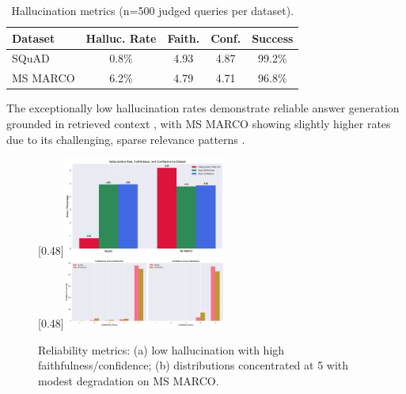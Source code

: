 \documentclass[conference]{IEEEtran}
\begin{document}
\begin{table}[ht]
\setlength{\tabcolsep}{4pt}
\centering
\caption{Hallucination metrics (n=500 judged queries per dataset).}
\label{tab:hallucination}
\begin{tabular}{@{}l c c c c@{}}
\toprule
\textbf{Dataset} & \textbf{Halluc. Rate} & \textbf{Faith.} & \textbf{Conf.} & \textbf{Success} \\
\midrule
SQuAD & 0.8\% & 4.93 & 4.87 & 99.2\% \\
MS MARCO & 6.2\% & 4.79 & 4.71 & 96.8\% \\
\bottomrule
\end{tabular}
\end{table}

The exceptionally low hallucination rates demonstrate reliable answer generation grounded in retrieved context \cite{hallucination_survey}, with MS MARCO showing slightly higher rates due to its challenging, sparse relevance patterns \cite{msmarco}.

\begin{figure}[!t]
\centering
\begingroup
\captionsetup{font=small}
[0.48\textwidth]{\includegraphics[width=0.48\textwidth]{images/evaluation_images/hallucination_score.png}}\\[4pt]
[0.48\textwidth]{\includegraphics[width=0.48\textwidth]{images/evaluation_images/confidence_score.png}}
\caption{Reliability metrics: (a) low hallucination with high faithfulness/confidence; (b) distributions concentrated at 5 with modest degradation on MS MARCO.}
\label{fig:reliability_overview}
\endgroup
\end{figure}
\end{document}
